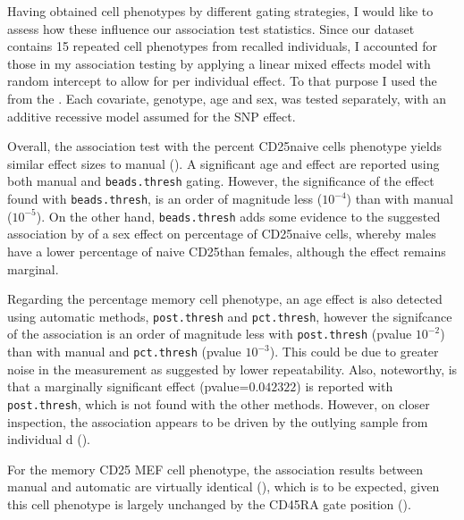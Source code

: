 Having obtained cell phenotypes by different gating strategies, 
I would like to assess how these influence our association test statistics.
Since our dataset contains 15 repeated cell phenotypes from recalled individuals,
I accounted for those in my association testing 
by applying a linear mixed effects model with random intercept to allow for per individual effect.
To that purpose I used the  from the .
Each covariate, genotype, age and sex, was tested separately, with an additive recessive model assumed for the SNP effect.

Overall, the association test with the percent CD25\positive naive cells phenotype yields similar effect sizes to manual ().
A significant age and  effect are reported using both manual and \texttt{beads.thresh} gating.
However, the significance of the  effect found with \texttt{beads.thresh}, is an order of magnitude less ($10^{-4}$) than with manual ($10^{-5}$).
On the other hand, \texttt{beads.thresh} adds some evidence to the suggested association by \citet{Dendrou:2009dv} of a sex effect on percentage of CD25\positive naive cells,
whereby males have a lower percentage of naive CD25\positive than females, although the effect remains marginal.

Regarding the percentage memory cell phenotype,
an age effect is also detected using automatic methods, \texttt{post.thresh} and \texttt{pct.thresh}, however the signifcance of the association 
is an order of magnitude less with \texttt{post.thresh} (pvalue $10^{-2}$) than with manual and \texttt{pct.thresh} (pvalue $10^{-3}$).
This could be due to greater noise in the measurement as suggested by lower repeatability.
Also, noteworthy, is that a marginally significant  effect (pvalue=$0.042322$) is reported with \texttt{post.thresh}, which is not found with the
other methods.  
However, on closer inspection, the association appears to be driven by the outlying sample from individual d ().

For the memory CD25 MEF cell phenotype, the association results between manual and automatic are virtually identical (),
which is to be expected, given this cell phenotype is largely unchanged by the CD45RA gate position ().





